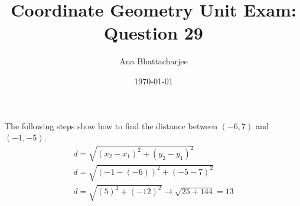 \documentclass{article}
\begin{document}
\title{Coordinate Geometry Unit Exam: Question 29}
\author{Ana Bhattacharjee}
\date{\today}
\maketitle{}

\begin{center}
The following steps show how to find the distance between $(-6, 7)$ and $(-1, -5)$.
\begin{align}
  d = \sqrt{(x_2 - x_1)^2 + (y_2 - y_1)^2} \\
  d = \sqrt{(-1 - (-6))^2 + (-5 - 7)^2} \\
  d = \sqrt{(5)^2 + (-12)^2} \rightarrow \sqrt{25 + 144} = 13 \\ 
\end{align}
\end{center}
\end{document}
